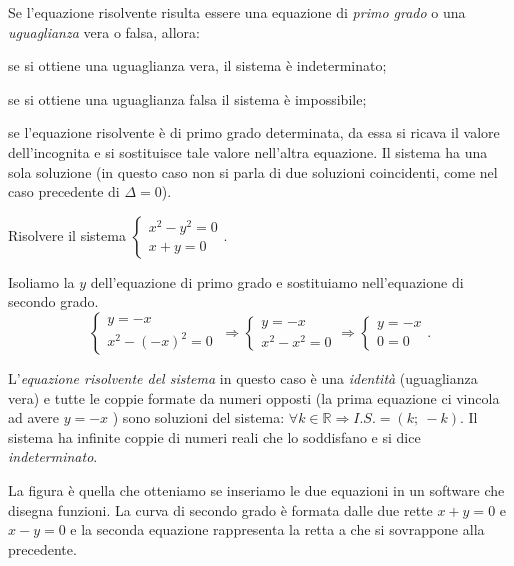 Se l'equazione risolvente risulta essere una equazione di \emph{primo grado} 
o una \emph{uguaglianza} vera o falsa, allora:
\begin{itemize*}
\item se si ottiene una uguaglianza vera, il sistema è indeterminato;
\item se si ottiene una uguaglianza falsa il sistema è impossibile;
\item se l'equazione risolvente è di primo grado determinata, da essa si 
ricava il valore dell'incognita e si sostituisce tale valore nell'altra 
equazione. 
Il sistema ha una sola soluzione (in questo caso non si parla di due 
soluzioni coincidenti, come nel caso precedente di \(\Delta =0\)).
\end{itemize*}
\begin{esempio}
Risolvere il sistema 
\(\left\{\begin{array}{l}x^2-y^2=0\\x+y=0\end{array}\right.\).

Isoliamo la \(y\) dell'equazione di primo grado e sostituiamo nell'equazione di 
secondo grado. 
\[\left\{\begin{array}{l}y=-x \\
x^2-(-x)^2=0\end{array}\right.\ 
\Rightarrow\left\{\begin{array}{l}y=-x \\
x^2-x^2=0\end{array}\right. 
\Rightarrow\left\{\begin{array}{l}y=-x\\
0=0\end{array}\right..\]

L'\emph{equazione risolvente del sistema} in questo caso è una \emph{identità} 
(uguaglianza vera) e tutte le coppie formate da numeri opposti (la prima 
equazione ci vincola ad avere \(y=-x\) ) sono soluzioni del sistema: \(\forall 
k\in 
\mathbb{R}\Rightarrow {I.S.}=(k;~-k)\). Il sistema ha infinite coppie di numeri 
reali che lo soddisfano e si dice \emph{indeterminato}.
\begin{multicols}{2}
La figura è quella che otteniamo se inseriamo le due equazioni in un software 
che disegna funzioni. La curva di secondo grado è formata dalle due rette 
\(x+y=0\) e \(x-y=0\) e la seconda equazione rappresenta la retta a che si 
sovrappone alla precedente.
\begin{center}

\end{center}
\end{multicols}
\end{esempio}

